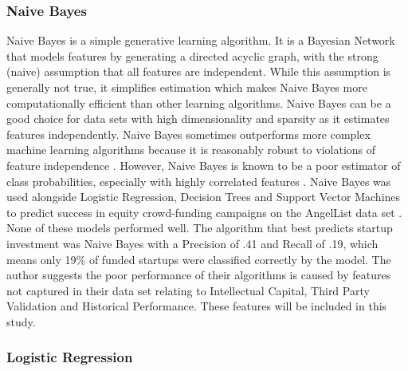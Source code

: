 \documentclass[../thesis/thesis.tex]{subfiles}
\begin{document}
\subsubsection{Naive Bayes}

Naive Bayes is a simple generative learning algorithm. It is a Bayesian Network that models features by generating a directed acyclic graph, with the strong (naive) assumption that all features are independent. While this assumption is generally not true, it simplifies estimation which makes Naive Bayes more computationally efficient than other learning algorithms. Naive Bayes can be a good choice for data sets with high dimensionality and sparsity as it estimates features independently. Naive Bayes sometimes outperforms more complex machine learning algorithms because it is reasonably robust to violations of feature independence \cite{kotsiantis2007}. However, Naive Bayes is known to be a poor estimator of class probabilities, especially with highly correlated features \cite{niculescu2005}. Naive Bayes was used alongside Logistic Regression, Decision Trees and Support Vector Machines to predict success in equity crowd-funding campaigns on the AngelList data set \cite{beckwith2016}. None of these models performed well. The algorithm that best predicts startup investment was Naive Bayes with a Precision of .41 and Recall of .19, which means only 19\% of funded startups were classified correctly by the model. The author suggests the poor performance of their algorithms is caused by features not captured in their data set relating to Intellectual Capital, Third Party Validation and Historical Performance. These features will be included in this study.

\subsubsection{Logistic Regression}
\end{document}
